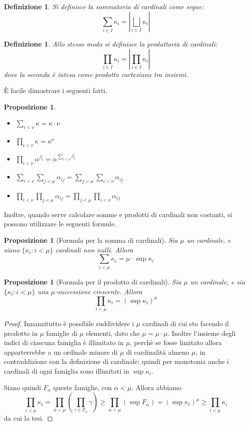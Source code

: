 \documentclass[a4paper,10pt,oneside]{article}
\theoremstyle{plain}
\newtheorem{mydef}[mytheorem]{Definizione}
\newtheorem{myprop}[mytheorem]{Proposizione}
\theoremstyle{definition}
\theoremstyle{remark}
\begin{document}
\begin{mydef}
 Si definisce la sommatoria di cardinali come segue:
 \[\sum_{i\in I}\kappa_i = \left|\bigsqcup_{i\in I}\kappa_i\right|\]
\end{mydef}

\begin{mydef}
 Allo stesso modo si definisce la produttoria di cardinali:
 \[\prod_{i\in I}\kappa_i = \left|\prod_{i\in I}\kappa_i\right|\]
 dove la seconda è intesa come prodotto cartesiano tra insiemi.
\end{mydef}

\`E facile dimostrare i seguenti fatti.
\begin{myprop}\
\begin{itemize}
 \item $\sum _{i<\nu} \kappa =\kappa\cdot \nu$
 \item $\prod_{i<\nu} \kappa =\kappa^\nu$
 \item $\prod_{i<\nu}\alpha^{\beta_i}=\alpha^{\sum_{i<\nu}\beta_i}$
 \item $\sum_{i<\nu}\sum_{j<\mu} \alpha_{ij}=\sum_{j<\mu}\sum_{i<\nu} \alpha_{ij} $
 \item $\prod_{i<\nu}\prod_{j<\mu} \alpha_{ij}=\prod_{j<\mu}\prod_{i<\nu} \alpha_{ij}$
\end{itemize}
\end{myprop}

Inoltre, quando serve calcolare somme e prodotti di cardinali non costanti, si possono utilizzare le seguenti formule.

\begin{myprop}[Formula per la somma di cardinali]
 Sia $\mu$ un cardinale, e siano $\{\kappa_i:i<\mu\}$ cardinali non nulli. Allora \[\sum_{i< \mu} \kappa_i = \mu\cdot \sup \kappa_i\]
\end{myprop}
\begin{myprop}[Formula per il prodotto di cardinali]
 Sia $\mu$ un cardinale, e sia $\{\kappa_i:i<\mu\}$ una $\mu$-successione crescente. Allora \[\prod_{i<\mu}\kappa_i=(\sup \kappa_i)^{\mu}\]
\end{myprop}

\begin{proof}
 Innanzitutto è possibile suddividere i $\mu$ cardinali di cui sto facendo il prodotto in $\mu$ famiglie di $\mu$ elementi, dato che $\mu= \mu\cdot \mu$. Inoltre l'insieme degli indici di ciascuna famiglia è illimitato in $\mu$, perchè se fosse limitato allora apparterrebbe a un ordinale minore di $\mu$ di cardinalità almeno $\mu$, in contraddizione con la definizione di cardinale; quindi per monotonia anche i cardinali di ogni famiglia sono illimitati in $\sup \kappa_i$.
 
 Siano quindi $F_\alpha$ queste famiglie, con $\alpha<\mu$.
 Allora abbiamo
 \[\prod_{i<\mu}\kappa_i = \prod_{\alpha<\mu}\left(\prod_{\gamma\in F_\alpha}\gamma\right)\ge \prod_{\alpha<\mu}\left(\sup F_\alpha \right)=\left(\sup\kappa_i\right)^\mu \ge \prod_{i<\mu}\kappa_i \]
 da cui la tesi.
\end{proof}
\end{document}
